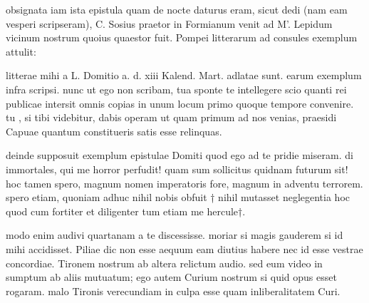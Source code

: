 


 obsignata iam ista epistula quam de nocte daturus eram, sicut dedi (nam eam vesperi scripseram), C. Sosius praetor in Formianum venit ad M'. Lepidum vicinum nostrum quoius quaestor fuit. Pompei litterarum ad consules exemplum attulit:

 litterae mihi a L. Domitio a. d. xiii Kalend. Mart. adlatae sunt. earum exemplum infra scripsi. nunc ut ego non scribam, tua sponte te intellegere scio quanti rei publicae intersit omnis copias in unum locum primo quoque tempore convenire. tu , si tibi videbitur, dabis operam ut quam primum ad nos venias, praesidi Capuae quantum constitueris satis esse relinquas.

 deinde supposuit exemplum epistulae Domiti quod ego ad te pridie miseram. di immortales, qui me horror perfudit! quam sum sollicitus quidnam futurum sit! hoc tamen spero, magnum nomen imperatoris fore, magnum in adventu terrorem. spero etiam, quoniam adhuc nihil nobis obfuit † nihil mutasset neglegentia hoc quod cum fortiter et diligenter tum etiam me hercule†.

 modo enim audivi quartanam a te discessisse. moriar si magis gauderem si id mihi accidisset. Piliae dic non esse aequum eam diutius habere nec id esse vestrae concordiae. Tironem nostrum ab altera relictum audio. sed eum video in sumptum ab aliis mutuatum; ego autem Curium nostrum si quid opus esset rogaram. malo Tironis verecundiam in culpa esse quam inliberalitatem Curi.
